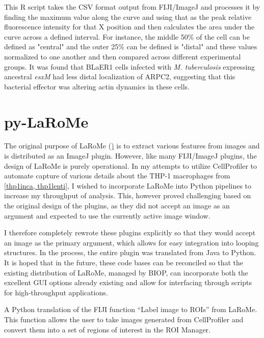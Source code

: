 This R script takes the CSV format output from FIJI/ImageJ and processes it by finding the maximum value along the curve and using that as the peak relative fluorescence intensity for that X position and then calculates the area under the curve across a defined interval. For instance, the middle 50\% of the cell can be defined as "central" and the outer 25\% can be defined is "distal" and these values normalized to one another and then compared across different experimental groups. It was found that BLaER1 cells infected with \textit{M. tuberculosis} expressing ancestral \textit{esxM} had less distal localization of ARPC2, suggesting that this bacterial effector was altering actin dynamics in these cells.

\section{py-LaRoMe}\label{larome}

The original purpose of LaRoMe (\href{https://github.com/BIOP/ijp-LaRoMe}) is to extract various features from images and is distributed as an ImageJ plugin. However, like many FIJI/ImageJ plugins, the design of LaRoMe is purely operational. In my attempts to utilize CellProfiler \citep{Carpenter2006, Kamentsky2011, McQuin2018, Stirling2021} to automate capture of various details about the THP-1 macrophages from \autoref{thp1inca, thp1lenti}, I wished to incorporate LaRoMe into Python pipelines to increase my throughput of analysis. This, however proved challenging based on the original design of the plugins, as they did not accept an image as an argument and expected to use the currently active image window.

I therefore completely rewrote these plugins explicitly so that they would accept an image as the primary argument, which allows for easy integration into looping structures. In the process, the entire plugin was translated from Java to Python. It is hoped that in the future, these code bases can be reconciled so that the existing distribution of LaRoMe, managed by BIOP, can incorporate both the excellent GUI options already existing and allow for interfacing through scripts for high-throughput applications.

\begin{code}
\caption{A Python translation of the FIJI function ``Label image to ROIs'' from LaRoMe. This function allows the user to take images generated from CellProfiler and convert them into a set of regions of interest in the ROI Manager.}
\label{l2r}

\inputminted[breaklines,frame=single,fontsize=\small]{python}{source/labelsToROIs.py}

\end{code}



